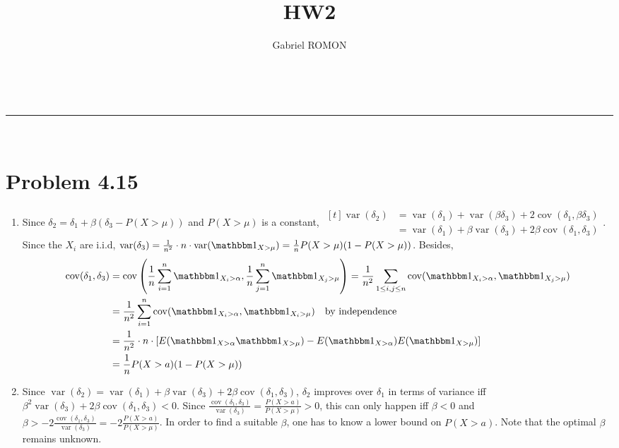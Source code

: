 \documentclass[a4paper,11pt]{article}
\makeatletter
\newcommand{\linia}{\rule{\linewidth}{0.5pt}}
\renewcommand{\maketitle}{
\begin{center}
\vspace{2ex}
{\huge \textsc{\@title}}
\vspace{1ex}
\\
\linia\\
\@author 
\vspace{4ex}
\end{center}
}
\DeclareMathOperator*{\var}{var}
\DeclareMathOperator*{\cov}{cov}
\makeatother
\begin{document}
\title{HW2}

\author{Gabriel ROMON}



\maketitle

\section*{Problem 4.15}

\begin{enumerate}[label=(\alph*)]
  \item Since $\delta_2 = \delta_1 + \beta(\delta_3-P(X>\mu))$ and $P(X>\mu)$ is a constant, $\begin{aligned}[t]\var(\delta_2) &= \var(\delta_1)+\var(\beta \delta_3) + 2\cov(\delta_1,\beta \delta_3)\\
  &= \var(\delta_1)+\beta \var( \delta_3) + 2\beta\cov(\delta_1, \delta_3)
  \end{aligned}$. Since the $X_i$ are i.i.d, $\var(\delta_3) = \frac 1{n^2} \cdot n \cdot \var(\mathbbm 1_{X>\mu}) = \frac 1n P(X>\mu)(1-P(X>\mu))$. Besides, $$\begin{aligned} 
  \cov(\delta_1, \delta_3) &= \cov\left(\frac 1n \sum_{i=1}^n \mathbbm 1_{X_i> \alpha}, \frac 1n \sum_{j=1}^n \mathbbm 1_{X_j> \mu} \right)
  = \frac 1{n^2} \sum_{1\leq i,j\leq n} \cov(\mathbbm 1_{X_i> \alpha}, \mathbbm 1_{X_j> \mu})\\
  &= \frac 1{n^2} \sum_{i=1}^n \cov(\mathbbm 1_{X_i> \alpha}, \mathbbm 1_{X_i> \mu}) \quad \text{by independence}\\
  &= \frac 1{n^2} \cdot n \cdot \left[E(\mathbbm 1_{X> \alpha} \mathbbm 1_{X> \mu}) - E(\mathbbm 1_{X> \alpha}) E(\mathbbm 1_{X> \mu})\right]\\
  &= \frac 1n P(X>a)(1-P(X>\mu))
  \end{aligned}$$

  \item Since $\var(\delta_2) = \var(\delta_1)+\beta \var( \delta_3) + 2\beta\cov(\delta_1, \delta_3)$, $\delta_2$ improves over $\delta_1$ in terms of variance iff $\beta^2\var(\delta_3) + 2\beta \cov(\delta_1, \delta_3)<0$. Since $\frac{\cov(\delta_1, \delta_3)}{\var(\delta_3)} = \frac{P(X>a)}{P(X>\mu)}>0$, this can only happen iff $\beta<0$ and $\beta > -2 \frac{\cov(\delta_1, \delta_3)}{\var(\delta_3)} = -2\frac{P(X>a)}{P(X>\mu)}$.\newline \newline
  In order to find a suitable $\beta$, one has to know a lower bound on $P(X>a)$. Note that the optimal $\beta$ remains unknown.


\end{enumerate}
\end{document}
